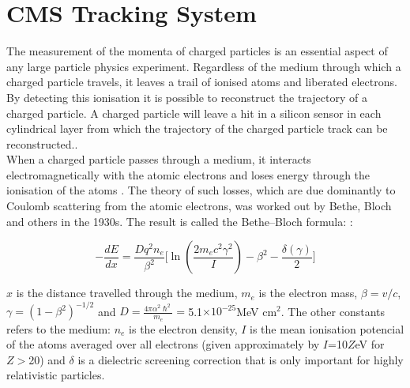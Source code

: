 \section{CMS Tracking System}
The measurement of the momenta of charged particles is an essential aspect of any large particle physics experiment. Regardless of the medium through which a charged particle travels, it leaves a trail of ionised atoms and liberated electrons. By detecting this ionisation it is possible to reconstruct the trajectory of a charged particle. A charged particle will leave a hit in a silicon sensor in each cylindrical layer from which the trajectory of the charged particle track can be reconstructed.\cite{thomson_2013}.\\
When a charged particle passes through a medium, it interacts electromagnetically with the atomic electrons and loses energy through the ionisation of the atoms \cite{thomson_2013}. The theory of such losses, which are due dominantly to Coulomb scattering from the atomic electrons, was worked out by Bethe, Bloch and others in the 1930s. The result is called the Bethe–Bloch formula: \cite{Martin2017_book}:

\begin{equation}
  -\frac{dE}{dx}= \frac{Dq^{2}n_{e}}{\beta ^{2}} \biggl[ \ln \left(\frac{2m_{e}c^{2}\gamma^{2}}{I} \right) -\beta^{2} -\frac{\delta(\gamma)}{2}  \biggr]
  \label{bethe}
\end{equation}

$x$ is the distance travelled through the medium, $m_{e}$ is the electron mass, $\beta=v/c$,  $\gamma =(1-\beta^{2})^{-1/2}$ and $D=\frac{4\pi \alpha^{2} \hslash^{2}}{m_{e}}=$5.1$\times 10^{-25}$MeV cm$^{2}$. The other constants refers to the medium: $n_{e}$ is the electron density, $I$ is the mean ionisation potencial of the atoms averaged over all electrons (given approximately by $I$=10$Z$eV for $Z>$20) and $\delta$ is a dielectric screening correction that is only important for highly relativistic particles. %


